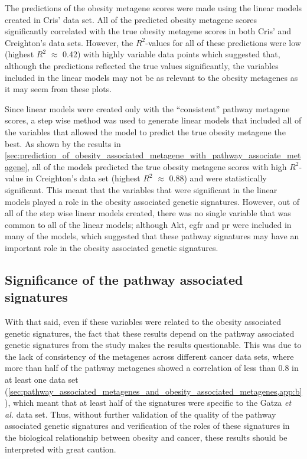 The predictions of the obesity metagene scores were made using the linear models created in Cris' data set.
All of the predicted obesity metagene scores significantly correlated with the true obesity metagene scores in both Cris' and Creighton's data sets.
However, the $R^2$-values for all of these predictions were low (highest $R^2$ $\approx$ 0.42) with highly variable data points which suggested that, although the predictions reflected the true values significantly, the variables included in the linear models may not be as relevant to the obesity metagenes as it may seem from these plots.

Since linear models were created only with the ``consistent'' pathway metagene scores, a step wise method was used to generate linear models that included all of the variables that allowed the model to predict the true obesity metagene the best.
As shown by the results in \cref{sec:prediction_of_obesity_associated_metagene_with_pathway_associate_metagene}, all of the models predicted the true obesity metagene scores with high $R^2$-value in Creighton's data set (highest $R^2$ $\approx$ 0.88) and were statistically significant.
This meant that the variables that were significant in the linear models played a role in the obesity associated genetic signatures.
However, out of all of the step wise linear models created, there was no single variable that was common to all of the linear models; although Akt, \gls{egfr} and \gls{pr} were included in many of the models, which suggested that these pathway signatures may have an important role in the obesity associated genetic signatures.

\subsection{Significance of the pathway associated signatures}
\label{sub:significance_of_pr_pathway}


With that said, even if these variables were related to the obesity associated genetic signatures, the fact that these results depend on the pathway associated genetic signatures from the \citet{Gatza2010a} study makes the results questionable.
This was due to the lack of consistency of the metagenes across different cancer data sets, where more than half of the pathway metagenes showed a correlation of less than 0.8 in at least one data set (\cref{sec:pathway_associated_metagenes_and_obesity_associated_metagenes,app:b}), which meant that at least half of the signatures were specific to the Gatza \textit{et al.} data set.
Thus, without further validation of the quality of the pathway associated genetic signatures and verification of the roles of these signatures in the biological relationship between obesity and cancer, these results should be interpreted with great caution.

